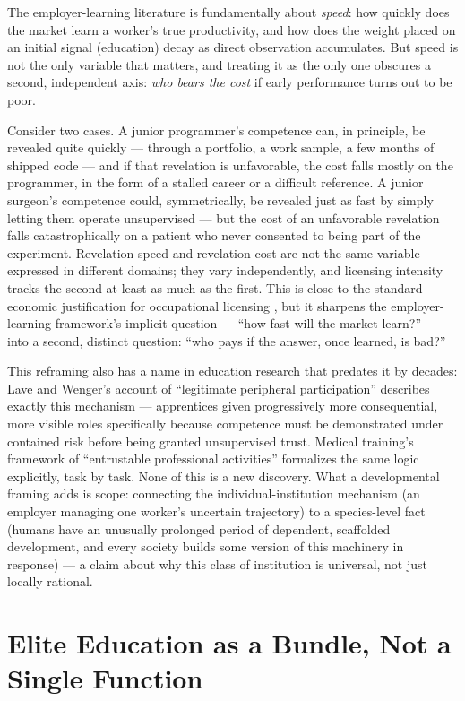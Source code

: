 \documentclass[11pt]{article}
\begin{document}
The employer-learning literature is fundamentally about \emph{speed}: how quickly does the market learn a worker's true productivity, and how does the weight placed on an initial signal (education) decay as direct observation accumulates. But speed is not the only variable that matters, and treating it as the only one obscures a second, independent axis: \emph{who bears the cost} if early performance turns out to be poor.

Consider two cases. A junior programmer's competence can, in principle, be revealed quite quickly --- through a portfolio, a work sample, a few months of shipped code --- and if that revelation is unfavorable, the cost falls mostly on the programmer, in the form of a stalled career or a difficult reference. A junior surgeon's competence could, symmetrically, be revealed just as fast by simply letting them operate unsupervised --- but the cost of an unfavorable revelation falls catastrophically on a patient who never consented to being part of the experiment. Revelation speed and revelation cost are not the same variable expressed in different domains; they vary independently, and licensing intensity tracks the second at least as much as the first. This is close to the standard economic justification for occupational licensing \cite{kleiner2013}, but it sharpens the employer-learning framework's implicit question --- ``how fast will the market learn?'' --- into a second, distinct question: ``who pays if the answer, once learned, is bad?''

This reframing also has a name in education research that predates it by decades: Lave and Wenger's account of ``legitimate peripheral participation'' \cite{lavewenger1991} describes exactly this mechanism --- apprentices given progressively more consequential, more visible roles specifically because competence must be demonstrated under contained risk before being granted unsupervised trust. Medical training's framework of ``entrustable professional activities'' formalizes the same logic explicitly, task by task. None of this is a new discovery. What a developmental framing adds is scope: connecting the individual-institution mechanism (an employer managing one worker's uncertain trajectory) to a species-level fact (humans have an unusually prolonged period of dependent, scaffolded development, and every society builds some version of this machinery in response) --- a claim about why this class of institution is universal, not just locally rational.

\section{Elite Education as a Bundle, Not a Single Function}
\end{document}
